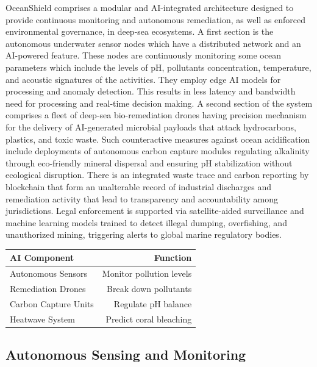 \documentclass[a4paper]{article}
\begin{document}
OceanShield comprises a modular and AI-integrated architecture designed to provide continuous monitoring and autonomous remediation, as well as enforced environmental governance, in deep-sea ecosystems. A first section is the autonomous underwater sensor nodes which have a distributed network and an AI-powered feature. These nodes are continuously monitoring some ocean parameters which include the levels of pH, pollutants concentration, temperature, and acoustic signatures of the activities. They employ edge AI models for processing and anomaly detection. This results in less latency and bandwidth need for processing and real-time decision making. A second section of the system comprises a fleet of deep-sea bio-remediation drones having precision mechanism for the delivery of AI-generated microbial payloads that attack hydrocarbons, plastics, and toxic waste. Such counteractive measures against ocean acidification include deployments of autonomous carbon capture modules regulating alkalinity through eco-friendly mineral dispersal and ensuring pH stabilization without ecological disruption. There is an integrated waste trace and carbon reporting by blockchain that form an unalterable record of industrial discharges and remediation activity that lead to transparency and accountability among jurisdictions. Legal enforcement is supported via satellite-aided surveillance and machine learning models trained to detect illegal dumping, overfishing, and unauthorized mining, triggering alerts to global marine regulatory bodies.

\begin{tabular}{l|r}
AI Component & Function \\\hline
Autonomous Sensors & Monitor pollution levels \\
Remediation Drones & Break down pollutants \\
Carbon Capture Units & Regulate pH balance \\
Heatwave System & Predict coral bleaching
\end{tabular}


\subsection{Autonomous Sensing and Monitoring}
\end{document}
